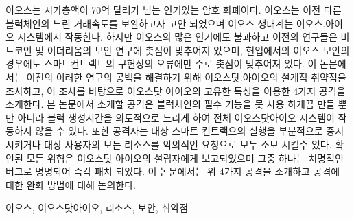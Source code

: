 
\begin{abstract2}

이오스는 시가총액이 70억 달러가 넘는 인기있는 암호 화폐이다. 이오스는 이전 다른 블럭체인의 느린 거래속도를 보완하고자 고안 되었으며 이오스 생태계는 이오스.아이오 시스템에서 작동한다. 하지만 이오스의 많은 인기에도 불과하고 이전의 연구들은 비트코인 및 이더리움의 보안 연구에 촛점이 맞추어져 있으며, 현업에서의 이오스 보안의 경우에도 스마트컨트랙트의 구현상의 오류에만 주로 촛점이 맞추어져 있다. 이 논문에서는 이전의 이러한 연구의 공백을 해결하기 위해 이오스닷.아이오의 설계적 취약점을 조사하고, 이 조사를 바탕으로 이오스닷 아이오의 고유한 특성을 이용한 4가지 공격을 소개한다. 본 논문에서 소개할 공격은 블럭체인의 필수 기능을 못 사용 하게끔 만들 뿐만 아니라 블럭 생성시간을 의도적으로 느리게 하여 전체 이오스닷아이오 시스템이 작동하지 않을 수 있다. 또한 공격자는 대상 스마트 컨트랙으의 실행을 부분적으로 중지 시키거나 대상 사용자의 모든 리소스를 악의적인 요청으로 모두 소모 시킬수 있다. 확인된 모든 위협은 이오스닷 아이오의 설립자에게 보고되었으며 그중 하나는 치명적인 버그로 명명되어 즉각 패치 되었다. 이 논문에서는 위 4가지 공격을 소개하고 공격에 대한 완화 방법에 대해 논의한다.

\end{abstract2}

\begin{Engkeyword2}
	이오스, 이오스닷아이오, 리소스, 보안, 취약점
\end{Engkeyword2}